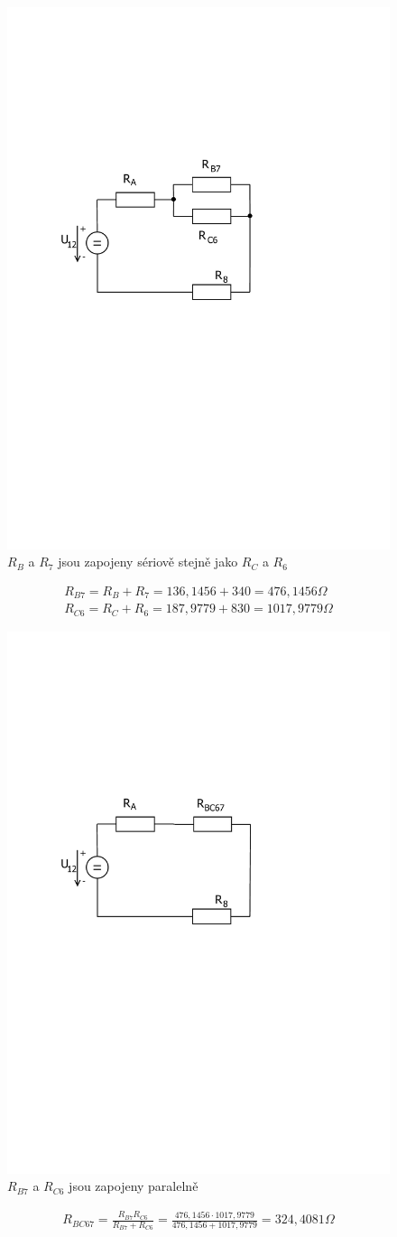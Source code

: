 	\begin{figure}[H]
		\center\includegraphics[width=0.6\linewidth]{obr/1_5}
		\caption*{$R_B$ a $R_7$ jsou zapojeny sériově stejně jako $R_C$ a $R_6$}
	\end{figure}
	\begin{gather*}
		R_{B7} = R_B + R_7 = 136,1456 + 340 = 476,1456 \Omega \\
		R_{C6} = R_C + R_6 =187,9779 + 830 = 1017,9779 \Omega
	\end{gather*}


	\begin{figure}[H]
		\center\includegraphics[width=0.6\linewidth]{obr/1_6}
		\caption*{ $R_{B7}$ a $R_{C6}$ jsou zapojeny paralelně}
	\end{figure}
	\begin{gather*}
		R_{BC67} = \frac{R_{B7} R_{C6}}{R_{B7} + R_{C6}} = \frac{476,1456 \cdot 1017,9779}{476,1456 + 1017,9779} = 324,4081 \Omega
	\end{gather*}

